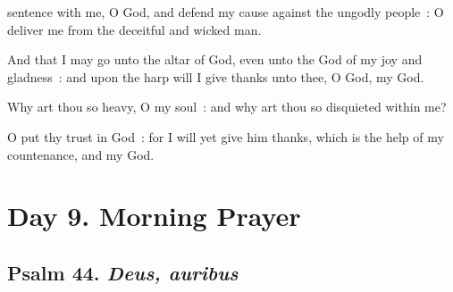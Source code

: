  sentence with me, O God, and defend my cause against the ungodly people~: O deliver me from the deceitful and wicked man.\par
{}
And that I may go unto the altar of God, even unto the God of my joy and gladness~: and upon the harp will I give thanks unto thee, O God, my God.\par
{}Why art thou so heavy, O my soul~: and why art thou so disquieted within me?\par
{}O put thy trust in God~: for I will yet give him thanks, which is the help of my countenance, and my God.\par

\clearpage
\section*{Day 9. Morning Prayer}

\subsection{Psalm 44. \textit{Deus, auribus}}

